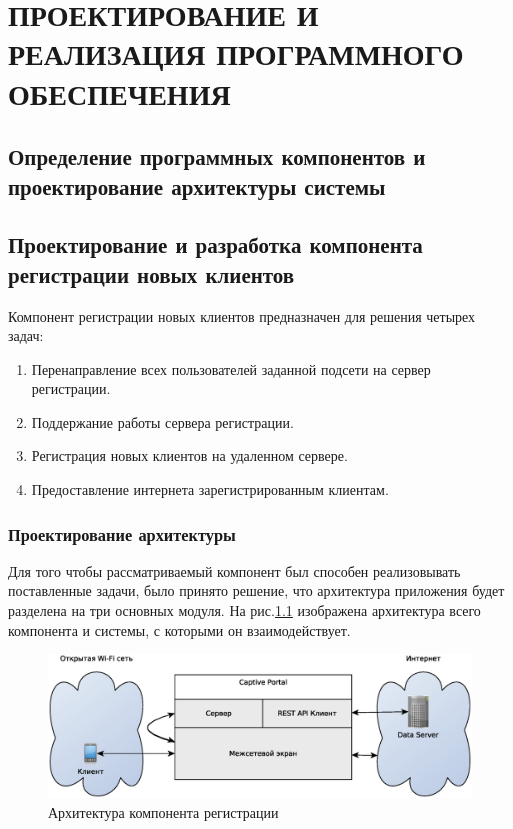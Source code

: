 \chapter{ПРОЕКТИРОВАНИЕ И РЕАЛИЗАЦИЯ ПРОГРАММНОГО ОБЕСПЕЧЕНИЯ}

\section{Определение программных компонентов и проектирование архитектуры системы}

\section{Проектирование и разработка компонента регистрации новых клиентов}

Компонент регистрации новых клиентов предназначен для решения четырех задач:

\begin{enumerate}
	\item Перенаправление всех пользователей заданной подсети на сервер регистрации.
	\item Поддержание работы сервера регистрации.
	\item Регистрация новых клиентов на удаленном сервере.
	\item Предоставление интернета зарегистрированным клиентам.
\end{enumerate}

\subsection{Проектирование архитектуры}

Для того чтобы рассматриваемый компонент был способен реализовывать поставленные задачи, было принято решение, что архитектура приложения будет разделена на три основных модуля. На рис.\ref{fig:CPArchitecture} изображена архитектура всего компонента и системы, с которыми он взаимодействует.

\begin{figure}[H]
	\centering
	\includegraphics[width=\linewidth]{fig/CPArchitecture}
	\caption{Архитектура компонента регистрации}
	\label{fig:CPArchitecture}
\end{figure}

